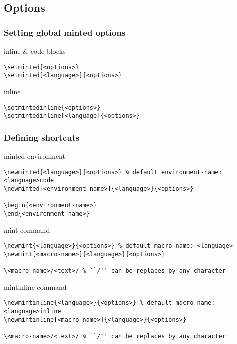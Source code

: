 \documentclass[../../latex]{subfiles}
\begin{document}
\subsection{Options}

\subsubsection{Setting global minted options}

inline \& code blocks

\begin{verbatim}
\setminted{<options>}
\setminted[<language>]{<options>}
\end{verbatim}

inline

\begin{verbatim}
\setmintedinline{<options>}
\setmintedinline[<language]{<options>}
\end{verbatim}

\subsubsection{Defining shortcuts}

minted environment

\begin{verbatim}
\newminted{<language>}{<options>} % default environment-name: <language>code
\newminted[<environment-name>]{<language>}{<options>}

\begin{<environment-name>}
\end{<environment-name>}
\end{verbatim}

mint command

\begin{verbatim}
\newmint{<language>}{<options>} % default macro-name: <language>
\newmint[<macro-name>]{<language>}{<options>}

\<macro-name>/<text>/ % ``/'' can be replaces by any character
\end{verbatim}

mintinline command

\begin{verbatim}
\newmintinline{<language>}{<options>} % default macro-name: <language>inline
\newmintinline[<macro-name>]{<language>}{<options>}

\<macro-name>/<text>/ % ``/'' can be replaces by any character
\end{verbatim}
\end{document}
